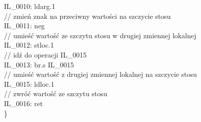 \documentclass[12pt]{article}
\begin{document}
{  IL\_0010:  ldarg.1 \\
// zmień znak na przeciwny wartości na szczycie stosu \\
  IL\_0011:  neg \\
// umieść wartość ze szczytu stosu w drugiej zmiennej lokalnej \\
  IL\_0012:  stloc.1 \\
// idź do operacji IL\_0015 \\
  IL\_0013:  br.s       IL\_0015 \\
// umieść wartość z drugiej zmiennej lokalnej na szczycie stosu \\
  IL\_0015:  ldloc.1 \\
// zwróć wartość ze szczytu stosu \\
  IL\_0016:  ret \\
\} }
\end{document}
